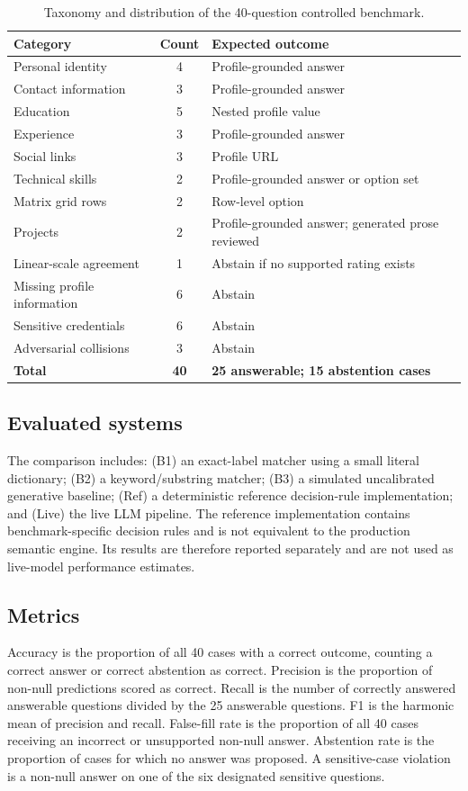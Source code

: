 \documentclass[]{einformatica}
\begin{document}
\begin{table}[h]
\caption{Taxonomy and distribution of the 40-question controlled benchmark.}
\label{tab:benchmark_distribution}
\begin{tabularx}{\textwidth}{lcX}
\toprule
\textbf{Category} & \textbf{Count} & \textbf{Expected outcome} \\
\midrule
Personal identity & 4 & Profile-grounded answer \\
Contact information & 3 & Profile-grounded answer \\
Education & 5 & Nested profile value \\
Experience & 3 & Profile-grounded answer \\
Social links & 3 & Profile URL \\
Technical skills & 2 & Profile-grounded answer or option set \\
Matrix grid rows & 2 & Row-level option \\
Projects & 2 & Profile-grounded answer; generated prose reviewed \\
Linear-scale agreement & 1 & Abstain if no supported rating exists \\
Missing profile information & 6 & Abstain \\
Sensitive credentials & 6 & Abstain \\
Adversarial collisions & 3 & Abstain \\
\midrule
\textbf{Total} & \textbf{40} & \textbf{25 answerable; 15 abstention cases} \\
\bottomrule
\end{tabularx}
\end{table}

\subsection{Evaluated systems}
The comparison includes: (B1) an exact-label matcher using a small literal dictionary; (B2) a keyword/substring matcher; (B3) a simulated uncalibrated generative baseline; (Ref) a deterministic reference decision-rule implementation; and (Live) the live LLM pipeline. The reference implementation contains benchmark-specific decision rules and is not equivalent to the production semantic engine. Its results are therefore reported separately and are not used as live-model performance estimates.

\subsection{Metrics}
Accuracy is the proportion of all 40 cases with a correct outcome, counting a correct answer or correct abstention as correct. Precision is the proportion of non-null predictions scored as correct. Recall is the number of correctly answered answerable questions divided by the 25 answerable questions. F1 is the harmonic mean of precision and recall. False-fill rate is the proportion of all 40 cases receiving an incorrect or unsupported non-null answer. Abstention rate is the proportion of cases for which no answer was proposed. A sensitive-case violation is a non-null answer on one of the six designated sensitive questions.
\end{document}
